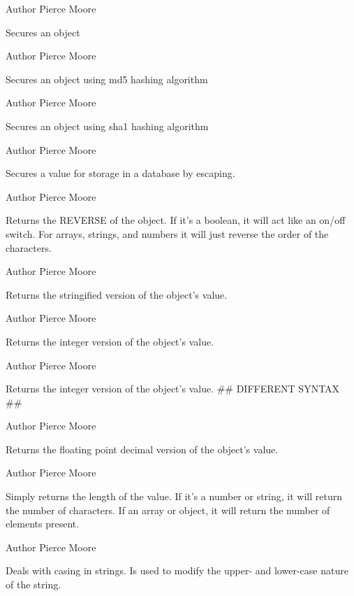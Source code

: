 \begin{DoxyAuthor}{Author}
Pierce Moore
\end{DoxyAuthor}
Secures an object

\begin{DoxyAuthor}{Author}
Pierce Moore
\end{DoxyAuthor}
Secures an object using md5 hashing algorithm

\begin{DoxyAuthor}{Author}
Pierce Moore
\end{DoxyAuthor}
Secures an object using sha1 hashing algorithm

\begin{DoxyAuthor}{Author}
Pierce Moore
\end{DoxyAuthor}
Secures a value for storage in a database by escaping.

\begin{DoxyAuthor}{Author}
Pierce Moore
\end{DoxyAuthor}
Returns the R\-E\-V\-E\-R\-S\-E of the object. If it's a boolean, it will act like an on/off switch. For arrays, strings, and numbers it will just reverse the order of the characters.

\begin{DoxyAuthor}{Author}
Pierce Moore
\end{DoxyAuthor}
Returns the stringified version of the object's value.

\begin{DoxyAuthor}{Author}
Pierce Moore
\end{DoxyAuthor}
Returns the integer version of the object's value.

\begin{DoxyAuthor}{Author}
Pierce Moore
\end{DoxyAuthor}
Returns the integer version of the object's value. \#\# D\-I\-F\-F\-E\-R\-E\-N\-T S\-Y\-N\-T\-A\-X \#\#

\begin{DoxyAuthor}{Author}
Pierce Moore
\end{DoxyAuthor}
Returns the floating point decimal version of the object's value.

\begin{DoxyAuthor}{Author}
Pierce Moore
\end{DoxyAuthor}
Simply returns the length of the value. If it's a number or string, it will return the number of characters. If an array or object, it will return the number of elements present.

\begin{DoxyAuthor}{Author}
Pierce Moore
\end{DoxyAuthor}
Deals with casing in strings. Is used to modify the upper-\/ and lower-\/case nature of the string.


